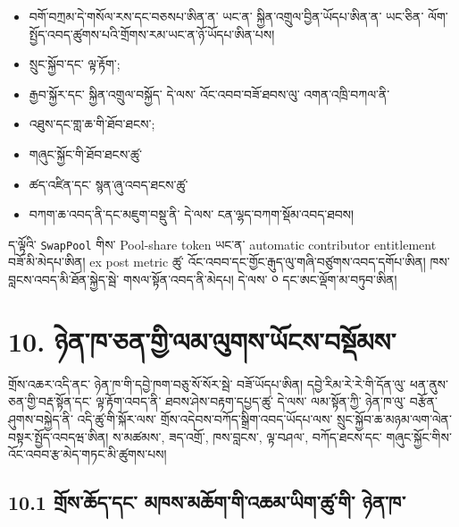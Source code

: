 \documentclass[11pt]{article}
\begin{document}
\begin{itemize}[leftmargin=*]
\item བགོ་བཀྲམ་དེ་གསོལ་རས་དང་བཅསཔ་ཨིན་ན་ ཡང་ན་ སྐྱིན་འགྲུལ་བྱིན་ཡོདཔ་ཨིན་ན་ ཡང་ཅིན་ ལོག་སྤྱོད་འབད་ཚུགས་པའི་གྲོགས་རམ་ཡང་ན་ཉོ་ཡོདཔ་ཨིན་པས།
\item སྲུང་སྐྱོབ་དང་ ལྟ་རྟོག་;
\item རྒྱབ་སྐྱོར་དང་ སྐྱིན་འགྲུལ་བསྐྱོད་ དེ་ལས་ འོང་འབབ་བཟོ་ཐབས་ལུ་ འགན་འཁྲི་བཀལ་ནི་
\item འཐུས་དང་གླ་ཆ་གི་ཐོབ་ཐངས་;
\item གཞུང་སྐྱོང་གི་ཐོབ་ཐངས་ཚུ་
\item ཚད་འཛིན་དང་ སྙན་ཞུ་འབད་ཐངས་ཚུ་
\item བཀག་ཆ་འབད་ནི་དང་མཇུག་བསྡུ་ནི་ དེ་ལས་ ངན་ལྷད་བཀག་སྡོམ་འབད་ཐབས།
\end{itemize}
ད་ལྟོའི་ \texttt{SwapPool} གིས་ Pool-share token ཡང་ན་ automatic contributor entitlement བཟོ་མི་མེདཔ་ཨིན། ex post metric ཚུ་ འོང་འབབ་དང་གྱོང་རྒུད་ལུ་གཞི་བཙུགས་འབད་དགོཔ་ཨིན། ཁས་བླངས་འབད་མི་ཐོན་སྐྱེད་སྦེ་ གསལ་སྟོན་འབད་ནི་མེདཔ། དེ་ལས་ ༠ དང་ཨང་ལྡོག་མ་བཏུབ་ཨིན།


\section*{10. ཉེན་ཁ་ཅན་གྱི་ལམ་ལུགས་ཡོངས་བསྡོམས་}

གྲོས་འཆར་འདི་ནང་ ཉེན་ཁ་གི་དབྱེ་ཁག་བཅུ་སོ་སོར་སྦེ་ བཟོ་ཡོདཔ་ཨིན། དབྱེ་རིམ་རེ་རེ་གི་དོན་ལུ་ ཕན་ནུས་ཅན་གྱི་བརྡ་སྟོན་དང་ ལྟ་རྟོག་འབད་ནི་ ཐབས་ཤེས་བརྟག་དཔྱད་ཚུ་ དེ་ལས་ ལམ་སྟོན་ཀྱི་ ཉེན་ཁ་ལུ་ བརྩོན་ཤུགས་བསྐྱེད་ནི་ འདི་ཚུ་གི་སྐོར་ལས་ གྲོས་འདེབས་བཀོད་སྒྲིག་འབད་ཡོདཔ་ལས་ སྲུང་སྐྱོབ་ཆ་མཉམ་ལག་ལེན་བསྟར་སྤྱོད་འབདཝ་ཨིན། ས་མཚམས་, ཟད་འགྲོ་, ཁས་བླངས་, ལྟ་བཤལ་, བཀོད་ཐངས་དང་ གཞུང་སྐྱོང་གིས་ འོང་འབབ་རྩ་མེད་གཏང་མི་ཚུགས་པས།

\subsection*{10.1 གྲོས་ཆོད་དང་ མཁས་མཆོག་གི་འཆམ་ཡིག་ཚུ་གི་ ཉེན་ཁ་}
\end{document}
